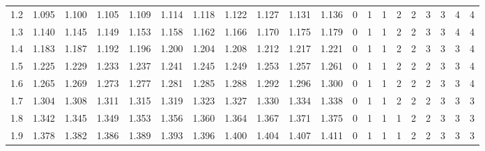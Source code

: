 \begin{table}[H]
{\begin{tabular}{|c|c|c|c|c|c|c|c|c|c|c|c|c|c|c|c|c|c|c|c|}
        1.2 & 1.095 & 1.100 & 1.105 & 1.109 & 1.114 & 1.118 & 1.122 & 1.127 & 1.131 & 1.136 & 0 & 1 & 1 & 2 & 2 & 3 & 3 & 4 & 4 \\
        1.3 & 1.140 & 1.145 & 1.149 & 1.153 & 1.158 & 1.162 & 1.166 & 1.170 & 1.175 & 1.179 & 0 & 1 & 1 & 2 & 2 & 3 & 3 & 4 & 4 \\
        1.4 & 1.183 & 1.187 & 1.192 & 1.196 & 1.200 & 1.204 & 1.208 & 1.212 & 1.217 & 1.221 & 0 & 1 & 1 & 2 & 2 & 3 & 3 & 3 & 4 \\
        1.5 & 1.225 & 1.229 & 1.233 & 1.237 & 1.241 & 1.245 & 1.249 & 1.253 & 1.257 & 1.261 & 0 & 1 & 1 & 2 & 2 & 2 & 3 & 3 & 4 \\
        1.6 & 1.265 & 1.269 & 1.273 & 1.277 & 1.281 & 1.285 & 1.288 & 1.292 & 1.296 & 1.300 & 0 & 1 & 1 & 2 & 2 & 2 & 3 & 3 & 4 \\
        1.7 & 1.304 & 1.308 & 1.311 & 1.315 & 1.319 & 1.323 & 1.327 & 1.330 & 1.334 & 1.338 & 0 & 1 & 1 & 2 & 2 & 2 & 3 & 3 & 3 \\
        1.8 & 1.342 & 1.345 & 1.349 & 1.353 & 1.356 & 1.360 & 1.364 & 1.367 & 1.371 & 1.375 & 0 & 1 & 1 & 1 & 2 & 2 & 3 & 3 & 3 \\
        1.9 & 1.378 & 1.382 & 1.386 & 1.389 & 1.393 & 1.396 & 1.400 & 1.404 & 1.407 & 1.411 & 0 & 1 & 1 & 1 & 2 & 2 & 3 & 3 & 3 \\
        \hline
    \end{tabular}%
    }
\end{table}
